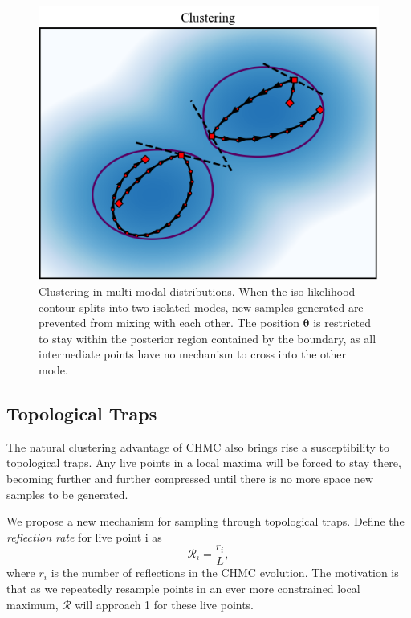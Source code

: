 \documentclass[11pt]{article}
\begin{document}
    \begin{figure}[t!]
        \center
        \includegraphics[width=\linewidth]{../figures/Clustering}
        \caption{
        Clustering in multi-modal distributions. When the iso-likelihood contour splits into
        two isolated modes, new samples generated are prevented from mixing with each other.
        The position $\mathbf{\theta}$ is restricted to stay within the posterior region contained by the boundary,
        as all intermediate points have no mechanism to cross into the other mode.
        }\label{fig:clustering}
    \end{figure}

    \subsection{Topological Traps}
    The natural clustering advantage of CHMC also brings rise a susceptibility to topological traps.
    Any live points in a local maxima will be forced to stay there, becoming further and further compressed until there
    is no more space new samples to be generated.

    We propose a new mechanism for sampling through topological traps.
    Define the \emph{reflection rate} for live point i as
    \begin{equation}\label{eq:reflect_rate}
        \mathcal{R}_i = \frac{r_i}{L},
    \end{equation}
    where $r_i$ is the number of reflections in the CHMC evolution.
    The motivation is that as we repeatedly resample points in an ever more constrained local maximum,
    $\mathcal{R}$ will approach 1 for these live points.
\end{document}

